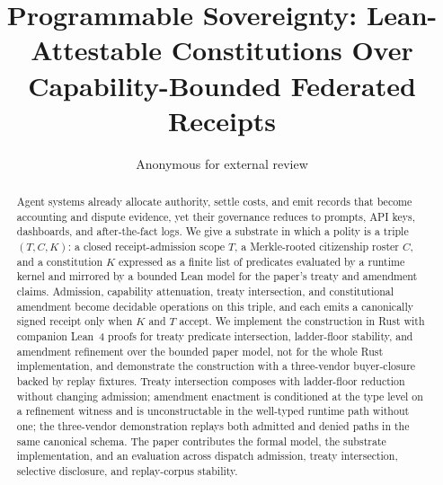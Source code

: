 \documentclass[sigconf,anonymous,review,nonacm]{acmart}
\title{Programmable Sovereignty: Lean-Attestable Constitutions Over Capability-Bounded Federated Receipts}
\author{Anonymous for external review}
\affiliation{\institution{Anonymous Institution}}
\begin{document}
\begin{abstract}
Agent systems already allocate authority, settle costs, and emit records that become accounting and dispute evidence, yet their governance reduces to prompts, API keys, dashboards, and after-the-fact logs. We give a substrate in which a polity is a triple $(T, C, K)$: a closed receipt-admission scope $T$, a Merkle-rooted citizenship roster $C$, and a constitution $K$ expressed as a finite list of predicates evaluated by a runtime kernel and mirrored by a bounded Lean model for the paper's treaty and amendment claims. Admission, capability attenuation, treaty intersection, and constitutional amendment become decidable operations on this triple, and each emits a canonically signed receipt only when $K$ and $T$ accept. We implement the construction in Rust with companion Lean~4 proofs for treaty predicate intersection, ladder-floor stability, and amendment refinement over the bounded paper model, not for the whole Rust implementation, and demonstrate the construction with a three-vendor buyer-closure backed by replay fixtures. Treaty intersection composes with ladder-floor reduction without changing admission; amendment enactment is conditioned at the type level on a refinement witness and is unconstructable in the well-typed runtime path without one; the three-vendor demonstration replays both admitted and denied paths in the same canonical schema. The paper contributes the formal model, the substrate implementation, and an evaluation across dispatch admission, treaty intersection, selective disclosure, and replay-corpus stability.
\end{abstract}

\maketitle














\end{document}
